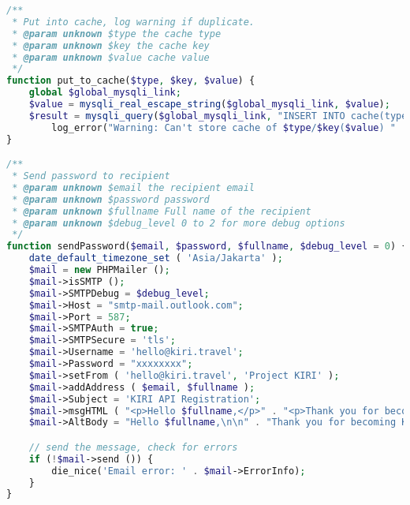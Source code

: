 \begin{lstlisting}[language=PHP,basicstyle=\tiny,caption=utils.php,label={lst:utils.php}]
/**
 * Put into cache, log warning if duplicate.
 * @param unknown $type the cache type
 * @param unknown $key the cache key
 * @param unknown $value cache value
 */
function put_to_cache($type, $key, $value) {
	global $global_mysqli_link;
	$value = mysqli_real_escape_string($global_mysqli_link, $value);
	$result = mysqli_query($global_mysqli_link, "INSERT INTO cache(type, cacheKey, cacheValue) VALUES('$type', '$key','$value')") or
		log_error("Warning: Can't store cache of $type/$key($value) " . mysqli_error($global_mysqli_link));
}

/**
 * Send password to recipient
 * @param unknown $email the recipient email
 * @param unknown $password password
 * @param unknown $fullname Full name of the recipient
 * @param unknown $debug_level 0 to 2 for more debug options
 */
function sendPassword($email, $password, $fullname, $debug_level = 0) {
	date_default_timezone_set ( 'Asia/Jakarta' );
	$mail = new PHPMailer ();
	$mail->isSMTP ();
	$mail->SMTPDebug = $debug_level;
	$mail->Host = "smtp-mail.outlook.com";
	$mail->Port = 587;
	$mail->SMTPAuth = true;
	$mail->SMTPSecure = 'tls';
	$mail->Username = 'hello@kiri.travel';
	$mail->Password = "xxxxxxxx";
	$mail->setFrom ( 'hello@kiri.travel', 'Project KIRI' );
	$mail->addAddress ( $email, $fullname );
	$mail->Subject = 'KIRI API Registration';
	$mail->msgHTML ( "<p>Hello $fullname,</p>" . "<p>Thank you for becoming KIRI Friends. Please find below your<br/>" . "initial password (8 characters of alphanumerics): <pre>$password</pre><br/>" . "Please login to our site and change your password immediately.</p>" . "<p>Sincerely yours,<br/>" . "Pascal & Budyanto</p>" );
	$mail->AltBody = "Hello $fullname,\n\n" . "Thank you for becoming KIRI Friends. Please find below your\n" . "initial password (8 characters of alphanumerics): $password\n" . "Please login to our site and change your password immediately.\n\n" . "Sincerely yours,\n" . "Pascal & Budyanto\n";

	// send the message, check for errors
	if (!$mail->send ()) {
		die_nice('Email error: ' . $mail->ErrorInfo);
	}
}


\end{lstlisting}
